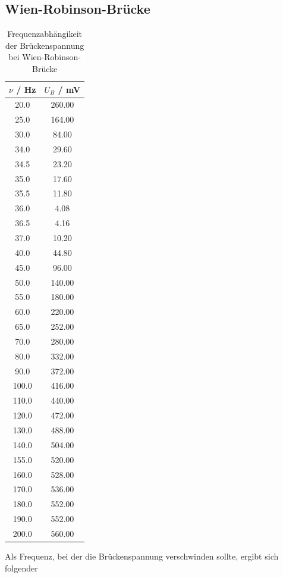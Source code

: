 \subsection{Wien-Robinson-Brücke}
\begin{table}
  \centering
  \caption{Frequenzabhängikeit der Brückenspannung bei Wien-Robinson-Brücke}
  \label{tab:7}
  \begin{tabular}{c c}
    \toprule
    $\nu$ / \si{\hertz} & $U_B$ / \si{\milli\volt}\\
    \midrule
    20.0  & 260.00  \\
    25.0  & 164.00  \\
    30.0  & 84.00  \\
    34.0  & 29.60  \\
    34.5 & 23.20  \\
    35.0 & 17.60  \\
    35.5 & 11.80 \\
    36.0 & 4.08  \\
    36.5 & 4.16  \\
    37.0 & 10.20  \\
    40.0 & 44.80  \\
    45.0 & 96.00  \\
    50.0 & 140.00  \\
    55.0 & 180.00  \\
    60.0 & 220.00  \\
    65.0 & 252.00  \\
    70.0 & 280.00  \\
    80.0 & 332.00  \\
    90.0 & 372.00  \\
    100.0 & 416.00  \\
    110.0 & 440.00  \\
    120.0 & 472.00  \\
    130.0 & 488.00  \\
    140.0 & 504.00  \\
    155.0 & 520.00  \\
    160.0 & 528.00  \\
    170.0 & 536.00  \\
    180.0 & 552.00  \\
    190.0 & 552.00 \\
    200.0 & 560.00 \\
    \bottomrule
  \end{tabular}
\end{table}
Als Frequenz, bei der die Brückenspannung verschwinden sollte, ergibt sich folgender
